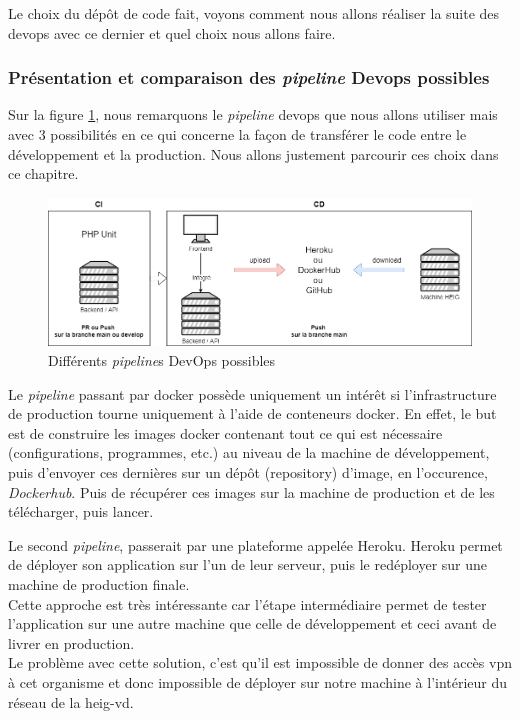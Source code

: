 \documentclass[
    iai, %
    il, %
]{heig-tb}
\begin{document}
Le choix du dépôt de code fait, voyons comment nous allons réaliser la suite des \Gls{devops} avec ce dernier et quel choix nous allons faire.

\subsubsection{Présentation et comparaison des \emph{pipeline} Devops possibles}

Sur la figure \ref{devops-choix.drawio}, nous remarquons le \emph{pipeline} \Gls{devops} que nous allons utiliser mais avec 3 possibilités en ce qui concerne la façon de transférer le code entre le développement et la production. Nous allons justement parcourir ces choix dans ce chapitre.

\begin{center}
    \begin{figure}[H]
        \includegraphics[width=\textwidth]{./assets/figures/devops-choix.drawio.png}
        \caption{Différents \emph{pipeline}s DevOps possibles \label{devops-choix.drawio}}
    \end{figure}
\end{center}

Le \emph{pipeline} passant par \Gls{docker} possède uniquement un intérêt si l'infrastructure de production tourne uniquement à l'aide de \Gls{conteneur}s \Gls{docker}. En effet, le but est de construire les images \Gls{docker} contenant tout ce qui est nécessaire (configurations, programmes, etc.) au niveau de la machine de développement, puis d'envoyer ces dernières sur un dépôt (\Gls{repository}) d'image, en l'occurence, \emph{Dockerhub}. Puis de
récupérer ces images sur la machine de production et de les télécharger, puis lancer.

Le second \emph{pipeline}, passerait par une plateforme appelée Heroku. Heroku permet de déployer son application sur l'un de leur serveur, puis le redéployer sur une machine de production finale.\\
Cette approche est très intéressante car l'étape intermédiaire permet de tester l'application sur une autre machine que celle de développement et ceci avant de livrer en production.\\
Le problème avec cette solution, c'est qu'il est impossible de donner des accès \Gls{vpn} à cet organisme et donc impossible de déployer sur notre machine à l'intérieur du réseau de la \Gls{heig-vd}.
\end{document}
